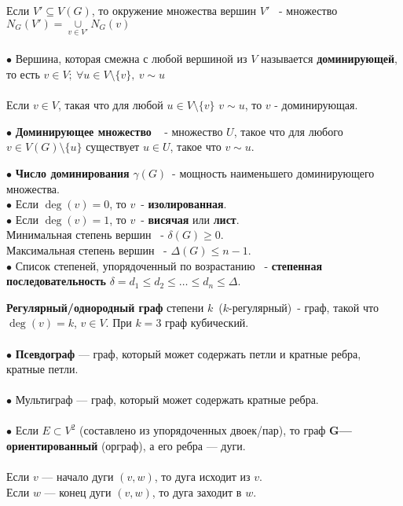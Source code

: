 \documentclass[a4paper, 12pt]{report}
\begin{document}
Если $V' \subseteq V(G)$, то окружение множества вершин $V'$~ - множество $N_G(V') = \underset{v \in V'}{\cup} N_G(v)$\\\\

$\bullet$ Вершина, которая смежна с любой вершиной из $V$ называется \textbf{доминирующей}, то есть $v \in V;~ \forall u \in V \setminus \{v\}, ~ v\sim u $\\\\

Если $v \in V$, такая что для любой $u \in V \setminus \{v\}$ $v \sim u$, то $v$ - доминирующая.

$ \bullet $ \textbf{Доминирующее множество} ~ - множество $U$, такое что для любого $v \in V(G) \setminus \{u\}$ существует $u \in U$, такое что $v \sim u$.

$ \bullet $ \textbf{Число доминирования} $\gamma(G)$~- мощность наименьшего доминирующего множества.\\

$ \bullet $ Если $\deg(v) = 0$, то $v$~-\textbf{ изолированная}.\\

$ \bullet $ Если $\deg(v) = 1$, то $v$~- \textbf{висячая} или \textbf{лист}.\\

Минимальная степень вершин~ - $\delta(G) \geq 0$.\\

Максимальная степень вершин~ - $\Delta(G) \leq n - 1$.\\

$ \bullet $ Список степеней, упорядоченный по возрастанию ~- \textbf{\textbf{степенная последовательность}} $\delta = d_1 \leq d_2 \leq \dots \leq d_n \leq \Delta$.

\textbf{Регулярный/однородный граф} степени $k$~($k$-регулярный)~- граф, такой что $\deg(v) = k$, $v \in V$. При $k = 3$ граф кубический.\\\\

$ \bullet $ \textbf{Псевдограф} — граф, который может содержать петли и кратные ребра, кратные петли.\\\\
$ \bullet $ Мультиграф — граф, который может содержать кратные ребра.\\\\
$ \bullet $ Если $E⊂V^2$ (составлено из упорядоченных двоек/пар), то граф \textbf{G—ориентированный} (орграф), а его ребра — дуги.\\\\
Если $ v $ — начало дуги $(v,w)$, то дуга исходит из $v$.\\ 
Если $ w  $ — конец дуги $(v,w)$, то дуга заходит в $ w $.\\\\
\end{document}
